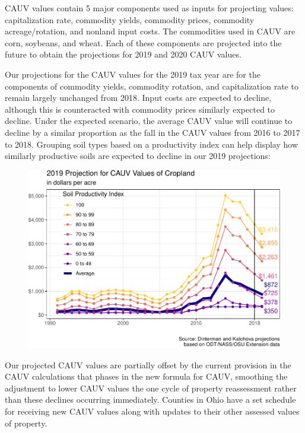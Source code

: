 \documentclass[]{article}
\begin{document}
CAUV values contain 5 major components used as inputs for projecting
values: capitalization rate, commodity yields, commodity prices,
commodity acreage/rotation, and nonland input costs. The commodities
used in CAUV are corn, soybeans, and wheat. Each of these components are
projected into the future to obtain the projections for 2019 and 2020
CAUV values.

Our projections for the CAUV values for the 2019 tax year are for the
components of commodity yields, commodity rotation, and capitalization
rate to remain largely unchanged from 2018. Input costs are expected to
decline, although this is counteracted with commodity prices similarly
expected to decline. Under the expected scenario, the average CAUV value
will continue to decline by a similar proportion as the fall in the CAUV
values from 2016 to 2017 to 2018. Grouping soil types based on a
productivity index can help display how similarly productive soils are
expected to decline in our 2019 projections:

\begin{figure}[H]
\includegraphics[width=1\linewidth]{4-projections-2019-2020_files/figure-latex/exp-trend-1} \caption{\label{fig:exp-trend}}\label{fig:exp-trend}
\end{figure}

Our projected CAUV values are partially offset by the current provision
in the CAUV calculations that phases in the new formula for CAUV,
smoothing the adjustment to lower CAUV values the one cycle of property
reassessment rather than these declines occurring immediately. Counties
in Ohio have a set schedule for receiving new CAUV values along with
updates to their other assessed values of property.
\end{document}
